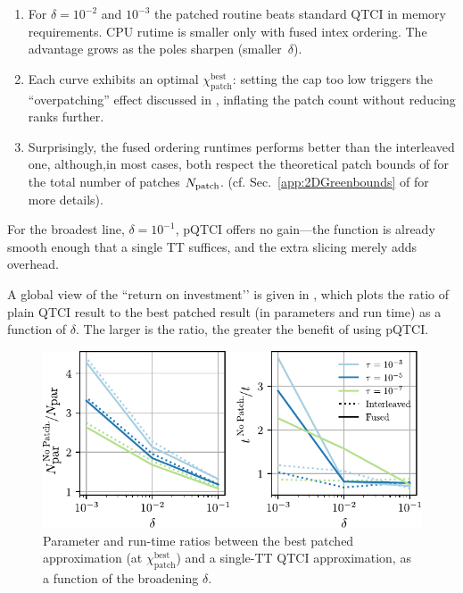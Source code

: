 \begin{enumerate}
\item For \(\delta=10^{-2}\) and \(10^{-3}\) the patched routine beats standard QTCI in memory requirements. CPU rutime is smaller only with fused intex ordering. The advantage grows as the poles sharpen (smaller~\(\delta\)).

\item Each curve exhibits an optimal
      \(\chi_{\text{patch}}^{\mathrm{best}}\): setting the cap too low triggers the ``overpatching'' effect discussed in
      , inflating the patch count without reducing ranks further.

\item Surprisingly, the fused ordering runtimes performs better than the interleaved one, although,in most cases, both respect the theoretical patch bounds of  for the total number of patches $N_{\text{patch}}$. (cf. Sec.~\ref{app:2DGreenbounds} of  for more details).
\end{enumerate}

For the broadest line, \(\delta=10^{-1}\), pQTCI offers no gain—the function is already smooth enough that a single TT suffices, and the extra slicing merely adds overhead.

A global view of the “return on investment’’ is given in , which plots the ratio of plain QTCI result to the best patched result (in parameters and run time) as a function of \(\delta\).  The larger is the ratio, the greater the benefit of using pQTCI.

\begin{figure}[htbp]
    \centering
    \includegraphics{figures/localisationParam2DGreen.pdf}
    \caption{Parameter and run-time ratios between the best patched approximation (at \(\chi_{\text{patch}}^{\mathrm{best}}\)) and a single-TT QTCI
    approximation, as a function of the broadening \(\delta\).} 
    \label{fig:deltavsMemoryTime}
\end{figure}

